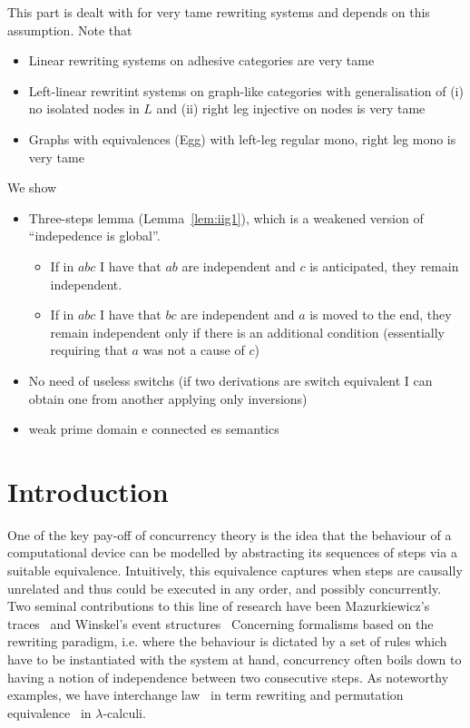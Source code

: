\documentclass[a4paper,UKenglish,cleveref,pdftex, thm-restate,numberwithinsect]{lipics}
\begin{document}
This part is dealt with for very tame rewriting systems and depends on this assumption. Note that
\begin{itemize}
\item Linear rewriting systems on adhesive categories are very tame
\item Left-linear rewritint systems on graph-like categories with generalisation of (i) no isolated nodes in $L$ and (ii) right leg injective on nodes is very tame
\item Graphs with equivalences (Egg) with left-leg regular mono, right leg mono is very tame
\end{itemize}

We show
\begin{itemize}

  
\item Three-steps lemma (Lemma~\ref{lem:iig1}), which is a weakened version of ``indepedence is global''.
  \begin{itemize}
    
  \item If in $abc$ I have that $ab$ are independent and $c$ is anticipated, they remain independent.
  \item  If in $abc$ I have that $bc$ are independent and $a$ is moved to the end, they remain independent only if there is an additional condition (essentially requiring that $a$ was not a cause of $c$)
  \end{itemize}

  
  
\item No need of useless switchs (if two derivations are switch equivalent I can obtain one from another applying only inversions)

\item weak prime domain e connected es semantics
\end{itemize}
\fi 

\section{Introduction}

%

One of the key pay-off of concurrency theory is the idea that the behaviour of 
a computational device can be modelled by abstracting its sequences of steps
via a suitable equivalence. Intuitively, this equivalence 
captures when steps are causally unrelated and thus could be executed in any 
order, and possibly concurrently. 
%
Two seminal contributions to this line of research have been
Mazurkiewicz's traces~\cite{Mazurkiewicz86} and Winskel's event structures~\cite{NPW:PNES}
%
Concerning formalisms based on the rewriting paradigm, i.e. where the
behaviour is dictated by a set of rules which have to be instantiated with
the system at hand, concurrency often boils down to having a notion of 
independence between two consecutive steps.
As noteworthy examples, we have 
interchange law~\cite{Mes92} in term rewriting and permutation 
equivalence~\cite{JJL80} in $\lambda$-calculi. 
\end{document}
